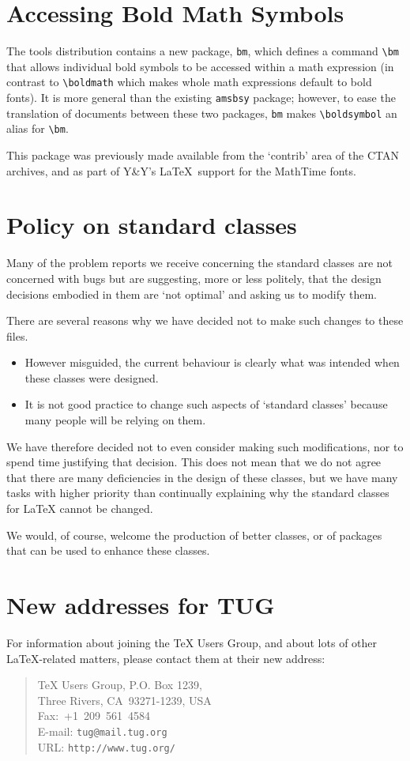 \documentclass{ltnews}
\providecommand\pkg[1]{\texttt{#1}}
\begin{document}
\section{Accessing Bold Math Symbols}
The \textsf{tools} distribution contains a new package, \pkg{bm},
which defines a command \verb|\bm| that allows individual bold symbols
to be accessed within a math expression (in contrast to
\verb|\boldmath| which makes whole math expressions default to bold
fonts). It is more general than the existing \pkg{amsbsy} package;
however, to ease the translation of documents between these two
packages, \pkg{bm} makes \verb|\boldsymbol| an alias for
\verb|\bm|.

This package was previously made available from the `contrib' area of
the CTAN archives, and as part of Y\&Y's \LaTeX\ support for the
MathTime fonts.


\section{Policy on standard classes}

Many of the problem reports we receive concerning the standard classes
are not concerned with bugs but are suggesting, more or less politely,
that the design decisions embodied in them are `not optimal' and
asking us to modify them.

There are several reasons why we have decided not to make such changes
to these files.
\begin{itemize}
\item
  However misguided, the current behaviour is clearly what was
  intended when these classes were designed.
\item
  It is not good practice to change such aspects of `standard classes'
  because many people will be relying on them.
\end{itemize}

We have therefore decided not to even consider making such
modifications, nor to spend time justifying that decision.  This does
not mean that we do not agree that there are many deficiencies in the
design of these classes, but we have many tasks with higher priority
than continually explaining why the standard classes for \LaTeX{}
cannot be changed.

We would, of course, welcome the production of better classes, or of
packages that can be used to enhance these classes.


\section{New addresses for TUG}
For information about joining the \TeX{} Users Group, and about lots
of other \LaTeX-related matters, please contact
them at their new address:
\begin{quote}\small
   \TeX{} Users Group, P.O. Box 1239,\\
   Three Rivers, CA~93271-1239, USA\\
   Fax:~+1~209~561~4584\\
   E-mail: \texttt{tug@mail.tug.org}\\
   URL: \texttt{http://www.tug.org/}
\end{quote}
\end{document}
